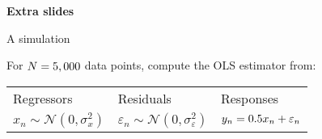 
\begin{frame}{}
\begin{center}
    {\Huge \textbf{Extra slides}}
\end{center}
\end{frame}




\begin{frame}{A simulation}

For $N=5,000$ data points, compute the OLS estimator from:

\vspace{1em}
\begin{tabularx}{\textwidth}{YYY}
    Regressors  &   Residuals   &   Responses \\
    $x_n \sim \mathcal{N}(0, \sigma_x^2)$   &
    $\varepsilon_n \sim \mathcal{N}(0, \sigma_\varepsilon^2)$   &
    $y_n = 0.5 x_n + \varepsilon_n$
\end{tabularx}
%

\SimGridNormalGraph{}

\end{frame}





